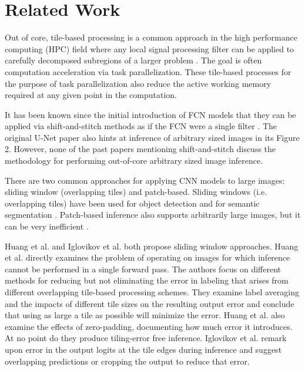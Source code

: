 \documentclass[10pt, indentfirst]{article}
\begin{document}
\section{Related Work}
\label{related-work}

Out of core, tile-based processing is a common approach in the high performance computing (HPC) field where any local signal processing filter can be applied to carefully decomposed subregions of a larger problem \citep{Blattner2017}. The goal is often computation acceleration via task parallelization. These tile-based processes for the purpose of task parallelization also reduce the active working memory required at any given point in the computation.

It has been known since the initial introduction of FCN models that they can be applied via shift-and-stitch methods as if the FCN were a single filter \citep{Long2015,Sherrah2016}.
The original U-Net paper \citep{Ronneberger2015a} also hints at inference of arbitrary sized images in its Figure 2. However, none of the past papers mentioning shift-and-stitch discuss the methodology for performing out-of-core arbitrary sized image inference.

There are two common approaches for applying CNN models to large images: sliding window (overlapping tiles) and patch-based. Sliding windows (i.e. overlapping tiles) have been used for object detection \citep{Sermanet2013,VanEtten2019} and for semantic segmentation \citep{Lin2019,Volpi2017a}. Patch-based inference also supports arbitrarily large images, but it can be very inefficient \citep{Volpi2017a,Maggiori2016}.

Huang et al. and Iglovikov et al. \citep{Huang2019a,Iglovikov2017} both propose sliding window approaches. Huang et al. \citep{Huang2019a} directly examines the problem of operating on images for which inference cannot be performed in a single forward pass. The authors focus on different methods for reducing but not eliminating the error in labeling that arises from different overlapping tile-based processing schemes. They examine label averaging and the impacts of different tile sizes on the resulting output error and conclude that using as large a tile as possible will minimize the error. Huang et al. \citep{Huang2019a} also examine the effects of zero-padding, documenting how much error it introduces. At no point do they produce tiling-error free inference. Iglovikov et al. \citep{Iglovikov2017} remark upon error in the output logits at the tile edges during inference and suggest overlapping predictions or cropping the output to reduce that error. 
\end{document}
